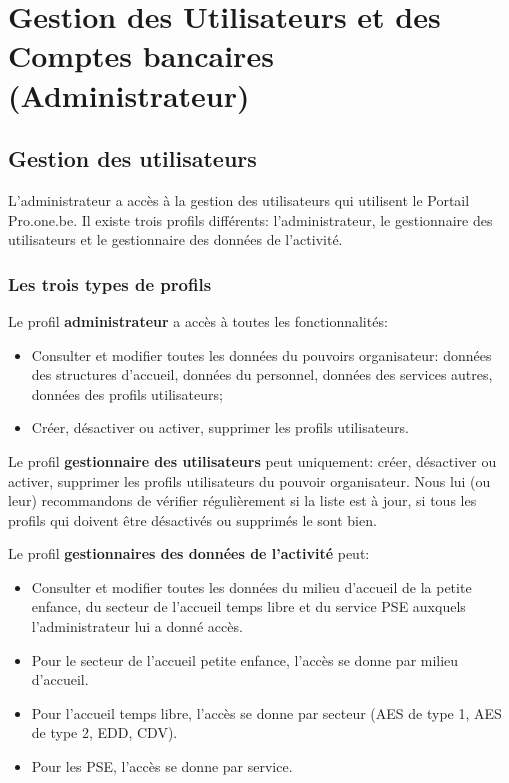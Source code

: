 \chapter{Gestion des Utilisateurs et des Comptes bancaires (Administrateur)}

\section{Gestion des utilisateurs}\label{gestion_users}
L'administrateur a accès à la gestion des utilisateurs qui utilisent le Portail Pro.one.be. Il existe trois profils différents: l’administrateur, le gestionnaire des utilisateurs et le gestionnaire des données de l’activité.

\subsection{Les trois types de profils}
Le profil \textbf{administrateur} a accès à toutes les fonctionnalités:
\begin{itemize}
    \item Consulter et modifier toutes les données du pouvoirs organisateur: données des structures d’accueil, données du personnel, données des services autres, données des profils utilisateurs;
    \item Créer, désactiver ou activer, supprimer les profils utilisateurs.
\end{itemize}

Le profil \textbf{gestionnaire des utilisateurs} peut uniquement: créer, désactiver ou activer, supprimer les profils utilisateurs du pouvoir organisateur. Nous lui (ou leur) recommandons de vérifier régulièrement si la liste est à jour, si tous les profils qui doivent être désactivés ou supprimés le sont bien.

Le profil \textbf{gestionnaires des données de l’activité} peut:
\begin{itemize}
    \item Consulter et modifier toutes les données du milieu d’accueil de la petite enfance, du secteur de l’accueil temps libre et du service PSE auxquels l'administrateur lui a donné accès.
    \item Pour le secteur de l’accueil petite enfance, l’accès se donne par milieu d’accueil.
    \item Pour l’accueil temps libre, l’accès se donne par secteur (AES de type 1, AES de type 2, EDD, CDV).
    \item Pour les PSE, l’accès se donne par service.
\end{itemize}

